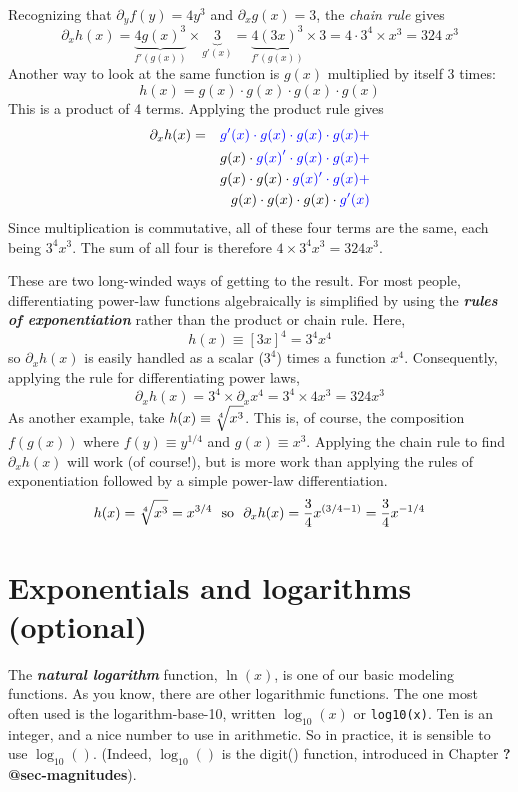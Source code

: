 \documentclass[
  letterpaper,
  DIV=11,
  numbers=noendperiod,
  oneside]{scrreprt}
\begin{document}
Recognizing that \(\partial_y f(y) = 4 y^3\) and
\(\partial_x g(x) = 3\), the \emph{chain rule} gives
\[\partial_x h(x) = 
\underbrace{4 g(x)^3}_{f'(g(x))} \times \underbrace{3}_{g'(x)} = \underbrace{4 (3 x)^3}_{f'(g(x))} \times 3 = 4\cdot 3^4 \times x^3 = 324\ x^3\]
Another way to look at the same function is \(g(x)\) multiplied by
itself 3 times: \[h(x) = g(x)\cdot g(x) \cdot g(x) \cdot g(x)\] This is
a product of 4 terms. Applying the product rule gives \begin{eqnarray}
\partial_x h(x) &=& \color{blue}{g'(x)}\cdot g(x)\cdot g(x) \cdot g(x) +\\
&\ & g(x)\cdot \color{blue}{g(x)}'\cdot g(x) \cdot g(x) +\\
&\ & g(x)\cdot g(x)\cdot \color{blue}{g(x)'} \cdot g(x) +\\
&\ & g(x)\cdot g(x)\cdot g(x) \cdot \color{blue}{g'(x)}
\end{eqnarray} Since multiplication is commutative, all of these four
terms are the same, each being \(3^4 x^3\). The sum of all four is
therefore \(4 \times 3^4 x^3 = 324 x^3\).

These are two long-winded ways of getting to the result. For most
people, differentiating power-law functions algebraically is simplified
by using the \textbf{\emph{rules of exponentiation}} rather than the
product or chain rule. Here,
\[h(x) \equiv \left[3x\right]^4 = 3^4 x^4\]so \(\partial_x h(x)\) is
easily handled as a scalar (\(3^4\)) times a function \(x^4\).
Consequently, applying the rule for differentiating power laws,
\[\partial_x h(x) = 3^4 \times \partial_x x^4 = 3^4 \times 4 x^3 = 324 x^3\]
As another example, take \(h(x) \equiv \sqrt[4]{\strut x^3}\). This is,
of course, the composition \(f(g(x))\) where \(f(y) \equiv y^{1/4}\) and
\(g(x) \equiv x^3\). Applying the chain rule to find \(\partial_x h(x)\)
will work (of course!), but is more work than applying the rules of
exponentiation followed by a simple power-law differentiation.
\[h(x) = \sqrt[4]{\strut x^3} = x^{3/4}\ \ \text{so}\ \  \partial_x h(x) = \frac{3}{4} x^{(3/4 - 1)} = \frac{3}{4} x^{-1/4}\]

\hypertarget{exponentials-and-logarithms-optional}{%
\section{Exponentials and logarithms
(optional)}\label{exponentials-and-logarithms-optional}}

The \textbf{\emph{natural logarithm}} function, \(\ln(x)\), is one of
our basic modeling functions. As you know, there are other logarithmic
functions. The one most often used is the logarithm-base-10, written
\(\log_{10}(x)\) or \texttt{log10(x)}. Ten is an integer, and a nice
number to use in arithmetic. So in practice, it is sensible to use
\(\log_{10}()\). (Indeed, \(\log_{10}()\) is the digit() function,
introduced in Chapter \textbf{?@sec-magnitudes}).
\end{document}
